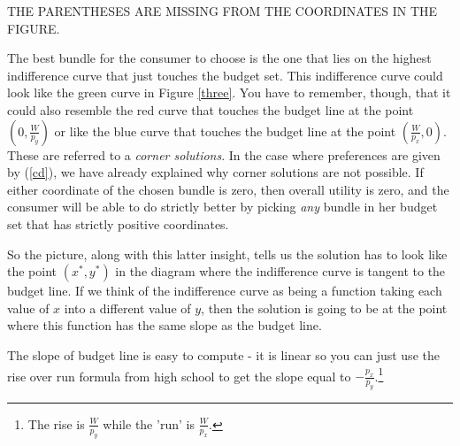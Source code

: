 \documentclass[12pt]{article}
\newcommand{\tmem}[1]{{\em #1\/}}
\begin{document}
THE PARENTHESES ARE MISSING FROM THE COORDINATES IN THE FIGURE.

The best bundle for the consumer to choose is the one that lies on the highest
indifference curve that just touches the budget set. This indifference curve
could look like the green curve in Figure \ref{three}. You have to remember,
though, that it could also resemble the red curve that touches the budget line
at the point $( 0, \frac{W}{p_y} )$ or like the blue curve that touches the
budget line at the point $( \frac{W}{p_x}, 0 )$. These are referred to a
{\tmem{corner solutions}}. In the case where preferences are given by
(\ref{cd}), we have already explained why corner solutions are not possible.
If either coordinate of the chosen bundle is zero, then overall utility is
zero, and the consumer will be able to do strictly better by picking
{\tmem{any}} bundle in her budget set that has strictly positive coordinates.

So the picture, along with this latter insight, tells us the solution has to
look like the point $( x^{\ast}, y^{\ast} )$ in the diagram where the
indifference curve is tangent to the budget line. If we think of the
indifference curve as being a function taking each value of $x$ into a
different value of $y$, then the solution is going to be at the point where
this function has the same slope as the budget line.

The slope of budget line is easy to compute - it is linear so you can just
use the rise over run formula from high school to get the slope equal to $-
\frac{p_x}{p_y}$.{\footnote{The rise is $\frac{W}{p_y}$ while the 'run' is
$\frac{W}{p_x}$.}}
\end{document}
